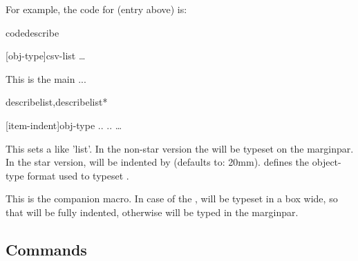 \documentclass{article}
\begin{document}
For example, the code for   (entry above) is:

\begin{codestore}[demoD]
\begin{codedescribe}[env,new=2023/05/01,update=2023/05/01,note={this is an example},update=2024/02/16]{codedescribe}
  \begin{codesyntax}
    \tsmacro{\begin{codedescribe}}[obj-type]{csv-list}
    \ldots
    \tsmacro{\end{codedescribe}}{}
  \end{codesyntax}
  This is the main ...
\end{codedescribe}
\end{codestore}  




\begin{codedescribe}[env]{describelist,describelist*}
  \begin{codesyntax}
\tsmacro{\begin{describelist}}[item-indent]{obj-type}
..
..
\ldots
\tsmacro{\end{describelist}}{}
  \end{codesyntax}
This sets a  like 'list'. In the non-star version the  will be typeset on the marginpar. In the star version,  will be indented by  (defaults to: 20mm).
 defines the object-type format used to typeset . 
\end{codedescribe}

\begin{codedescribe}[code]{\describe}
\begin{codesyntax}
\end{codesyntax}
This is the  companion macro. In case of the ,  will be typeset in a box  wide, so that  will be fully indented, otherwise  will be typed in the marginpar.
\end{codedescribe}


\subsection{Commands}
\end{document}
